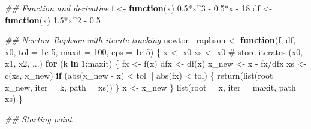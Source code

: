\documentclass[
  letterpaper,
  DIV=11,
  numbers=noendperiod]{scrreprt}
\newenvironment{Shaded}{\begin{snugshade}}{\end{snugshade}}
\newcommand{\AttributeTok}[1]{\textcolor[rgb]{0.40,0.45,0.13}{#1}}
\newcommand{\CommentTok}[1]{\textcolor[rgb]{0.37,0.37,0.37}{#1}}
\newcommand{\ControlFlowTok}[1]{\textcolor[rgb]{0.00,0.23,0.31}{\textbf{#1}}}
\newcommand{\DecValTok}[1]{\textcolor[rgb]{0.68,0.00,0.00}{#1}}
\newcommand{\DocumentationTok}[1]{\textcolor[rgb]{0.37,0.37,0.37}{\textit{#1}}}
\newcommand{\FloatTok}[1]{\textcolor[rgb]{0.68,0.00,0.00}{#1}}
\newcommand{\FunctionTok}[1]{\textcolor[rgb]{0.28,0.35,0.67}{#1}}
\newcommand{\NormalTok}[1]{\textcolor[rgb]{0.00,0.23,0.31}{#1}}
\newcommand{\OtherTok}[1]{\textcolor[rgb]{0.00,0.23,0.31}{#1}}
\newcommand{\SpecialCharTok}[1]{\textcolor[rgb]{0.37,0.37,0.37}{#1}}
\begin{document}
\begin{Shaded}
\begin{Highlighting}[]
\DocumentationTok{\#\# Function and derivative}
\NormalTok{f  }\OtherTok{\textless{}{-}} \ControlFlowTok{function}\NormalTok{(x) }\FloatTok{0.5}\SpecialCharTok{*}\NormalTok{x}\SpecialCharTok{\^{}}\DecValTok{3} \SpecialCharTok{{-}} \FloatTok{0.5}\SpecialCharTok{*}\NormalTok{x }\SpecialCharTok{{-}} \DecValTok{18}
\NormalTok{df }\OtherTok{\textless{}{-}} \ControlFlowTok{function}\NormalTok{(x) }\FloatTok{1.5}\SpecialCharTok{*}\NormalTok{x}\SpecialCharTok{\^{}}\DecValTok{2} \SpecialCharTok{{-}} \FloatTok{0.5}

\DocumentationTok{\#\# Newton–Raphson with iterate tracking}
\NormalTok{newton\_raphson }\OtherTok{\textless{}{-}} \ControlFlowTok{function}\NormalTok{(f, df, x0, }\AttributeTok{tol =} \FloatTok{1e{-}5}\NormalTok{, }
                           \AttributeTok{maxit =} \DecValTok{100}\NormalTok{, }\AttributeTok{eps =} \FloatTok{1e{-}5}\NormalTok{) \{}
\NormalTok{  x }\OtherTok{\textless{}{-}}\NormalTok{ x0}
\NormalTok{  xs }\OtherTok{\textless{}{-}}\NormalTok{ x0      }\CommentTok{\# store iterates (x0, x1, x2, ...)}
  \ControlFlowTok{for}\NormalTok{ (k }\ControlFlowTok{in} \DecValTok{1}\SpecialCharTok{:}\NormalTok{maxit) \{}
\NormalTok{    fx  }\OtherTok{\textless{}{-}} \FunctionTok{f}\NormalTok{(x)}
\NormalTok{    dfx }\OtherTok{\textless{}{-}} \FunctionTok{df}\NormalTok{(x)}
\NormalTok{    x\_new }\OtherTok{\textless{}{-}}\NormalTok{ x }\SpecialCharTok{{-}}\NormalTok{ fx}\SpecialCharTok{/}\NormalTok{dfx}
\NormalTok{    xs }\OtherTok{\textless{}{-}} \FunctionTok{c}\NormalTok{(xs, x\_new)}
    \ControlFlowTok{if}\NormalTok{ (}\FunctionTok{abs}\NormalTok{(x\_new }\SpecialCharTok{{-}}\NormalTok{ x) }\SpecialCharTok{\textless{}}\NormalTok{ tol }\SpecialCharTok{||} \FunctionTok{abs}\NormalTok{(fx) }\SpecialCharTok{\textless{}}\NormalTok{ tol) \{}
      \FunctionTok{return}\NormalTok{(}\FunctionTok{list}\NormalTok{(}\AttributeTok{root =}\NormalTok{ x\_new, }\AttributeTok{iter =}\NormalTok{ k, }\AttributeTok{path =}\NormalTok{ xs))}
\NormalTok{    \}}
\NormalTok{    x }\OtherTok{\textless{}{-}}\NormalTok{ x\_new}
\NormalTok{  \}}
  \FunctionTok{list}\NormalTok{(}\AttributeTok{root =}\NormalTok{ x, }\AttributeTok{iter =}\NormalTok{ maxit, }\AttributeTok{path =}\NormalTok{ xs)}
\NormalTok{\}}

\DocumentationTok{\#\# Starting point}
\end{Highlighting}
\end{Shaded}
\end{document}
